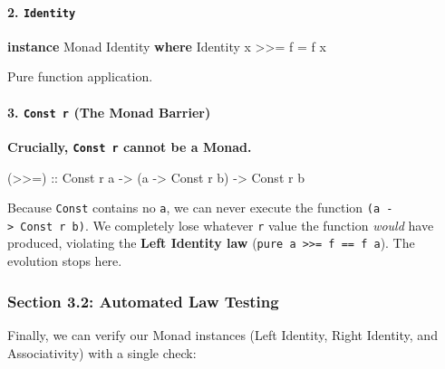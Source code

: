 \documentclass[
]{article}
\newenvironment{Shaded}{}{}
\newcommand{\DataTypeTok}[1]{\textcolor[rgb]{0.56,0.13,0.00}{#1}}
\newcommand{\KeywordTok}[1]{\textcolor[rgb]{0.00,0.44,0.13}{\textbf{#1}}}
\newcommand{\NormalTok}[1]{#1}
\newcommand{\OperatorTok}[1]{\textcolor[rgb]{0.40,0.40,0.40}{#1}}
\newcommand{\OtherTok}[1]{\textcolor[rgb]{0.00,0.44,0.13}{#1}}
\begin{document}
\paragraph{\texorpdfstring{2.
\texttt{Identity}}{2. Identity}}\label{identity-1}

\begin{Shaded}
\begin{Highlighting}[]
\KeywordTok{instance} \DataTypeTok{Monad} \DataTypeTok{Identity} \KeywordTok{where}
    \DataTypeTok{Identity}\NormalTok{ x }\OperatorTok{\textgreater{}\textgreater{}=}\NormalTok{ f }\OtherTok{=}\NormalTok{ f x}
\end{Highlighting}
\end{Shaded}

Pure function application.

\paragraph{\texorpdfstring{3. \texttt{Const\ r} (The Monad
Barrier)}{3. Const r (The Monad Barrier)}}\label{const-r-the-monad-barrier}

\textbf{Crucially, \texttt{Const\ r} cannot be a Monad.}

\begin{Shaded}
\begin{Highlighting}[]
\OtherTok{(\textgreater{}\textgreater{}=) ::} \DataTypeTok{Const}\NormalTok{ r a }\OtherTok{{-}\textgreater{}}\NormalTok{ (a }\OtherTok{{-}\textgreater{}} \DataTypeTok{Const}\NormalTok{ r b) }\OtherTok{{-}\textgreater{}} \DataTypeTok{Const}\NormalTok{ r b}
\end{Highlighting}
\end{Shaded}

Because \texttt{Const} contains no \texttt{a}, we can never execute the
function \texttt{(a\ -\textgreater{}\ Const\ r\ b)}. We completely lose
whatever \texttt{r} value the function \emph{would} have produced,
violating the \textbf{Left Identity law}
(\texttt{pure\ a\ \textgreater{}\textgreater{}=\ f\ ==\ f\ a}). The
evolution stops here.

\subsubsection{Section 3.2: Automated Law
Testing}\label{section-3.2-automated-law-testing}

Finally, we can verify our Monad instances (Left Identity, Right
Identity, and Associativity) with a single check:
\end{document}
